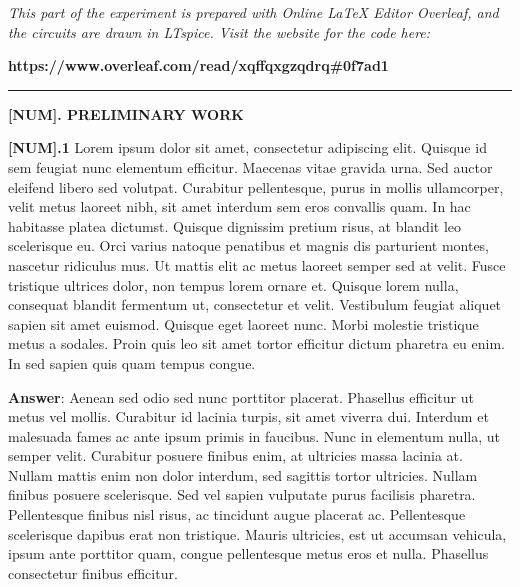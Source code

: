 \documentclass{article}
\begin{document}
\large

{\textit{This part of the experiment is prepared with Online LaTeX Editor Overleaf, and the circuits are drawn in LTspice. Visit the website for the code here:}} %

{\textbf{https://www.overleaf.com/read/xqffqxgzqdrq\#0f7ad1}}
\vspace{4mm}
\hrule
\vspace{4mm}
{\Large \textbf{[NUM]. PRELIMINARY WORK}} %

\vspace{4mm} %



{\textbf{[NUM].1} Lorem ipsum dolor sit amet, consectetur adipiscing elit. Quisque id sem feugiat nunc elementum efficitur. Maecenas vitae gravida urna. Sed auctor eleifend libero sed volutpat. Curabitur pellentesque, purus in mollis ullamcorper, velit metus laoreet nibh, sit amet interdum sem eros convallis quam. In hac habitasse platea dictumst. Quisque dignissim pretium risus, at blandit leo scelerisque eu. Orci varius natoque penatibus et magnis dis parturient montes, nascetur ridiculus mus. Ut mattis elit ac metus laoreet semper sed at velit. Fusce tristique ultrices dolor, non tempus lorem ornare et. Quisque lorem nulla, consequat blandit fermentum ut, consectetur et velit. Vestibulum feugiat aliquet sapien sit amet euismod. Quisque eget laoreet nunc. Morbi molestie tristique metus a sodales. Proin quis leo sit amet tortor efficitur dictum pharetra eu enim. In sed sapien quis quam tempus congue.} %

\vspace{4mm} %

{\textbf{Answer}: Aenean sed odio sed nunc porttitor placerat. Phasellus efficitur ut metus vel mollis. Curabitur id lacinia turpis, sit amet viverra dui. Interdum et malesuada fames ac ante ipsum primis in faucibus. Nunc in elementum nulla, ut semper velit. Curabitur posuere finibus enim, at ultricies massa lacinia at. Nullam mattis enim non dolor interdum, sed sagittis tortor ultricies. Nullam finibus posuere scelerisque. Sed vel sapien vulputate purus facilisis pharetra. Pellentesque finibus nisl risus, ac tincidunt augue placerat ac. Pellentesque scelerisque dapibus erat non tristique. Mauris ultricies, est ut accumsan vehicula, ipsum ante porttitor quam, congue pellentesque metus eros et nulla. Phasellus consectetur finibus efficitur.} %
\end{document}
